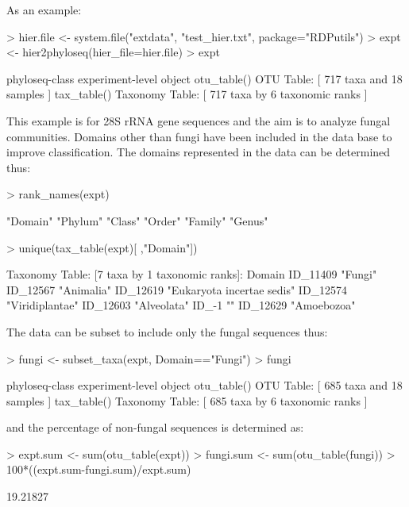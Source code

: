 \documentclass{article}
\begin{document}
As an example:
\begin{Schunk}
\begin{Sinput}
> hier.file <- system.file("extdata", "test_hier.txt", package="RDPutils")
> expt <- hier2phyloseq(hier_file=hier.file)
> expt
\end{Sinput}
\begin{Soutput}
phyloseq-class experiment-level object
otu_table()   OTU Table:         [ 717 taxa and 18 samples ]
tax_table()   Taxonomy Table:    [ 717 taxa by 6 taxonomic ranks ]
\end{Soutput}
\end{Schunk}
This example is for 28S rRNA gene sequences and the aim is to analyze fungal communities.  Domains other than fungi have been included in the data base to improve classification.  The domains represented in the data can be determined thus:
\begin{Schunk}
\begin{Sinput}
> rank_names(expt)
\end{Sinput}
\begin{Soutput}
[1] "Domain" "Phylum" "Class"  "Order"  "Family" "Genus" 
\end{Soutput}
\begin{Sinput}
> unique(tax_table(expt)[ ,"Domain"])
\end{Sinput}
\begin{Soutput}
Taxonomy Table:     [7 taxa by 1 taxonomic ranks]:
         Domain                    
ID_11409 "Fungi"                   
ID_12567 "Animalia"                
ID_12619 "Eukaryota incertae sedis"
ID_12574 "Viridiplantae"           
ID_12603 "Alveolata"               
ID_-1    ""                        
ID_12629 "Amoebozoa"               
\end{Soutput}
\end{Schunk}
The data can be subset to include only the fungal sequences thus:
\begin{Schunk}
\begin{Sinput}
> fungi <- subset_taxa(expt, Domain=="Fungi")
> fungi
\end{Sinput}
\begin{Soutput}
phyloseq-class experiment-level object
otu_table()   OTU Table:         [ 685 taxa and 18 samples ]
tax_table()   Taxonomy Table:    [ 685 taxa by 6 taxonomic ranks ]
\end{Soutput}
\end{Schunk}
and the percentage of non-fungal sequences is determined as:
\begin{Schunk}
\begin{Sinput}
> expt.sum <- sum(otu_table(expt))
> fungi.sum <- sum(otu_table(fungi))
> 100*((expt.sum-fungi.sum)/expt.sum)
\end{Sinput}
\begin{Soutput}
[1] 19.21827
\end{Soutput}
\end{Schunk}
\end{document}
